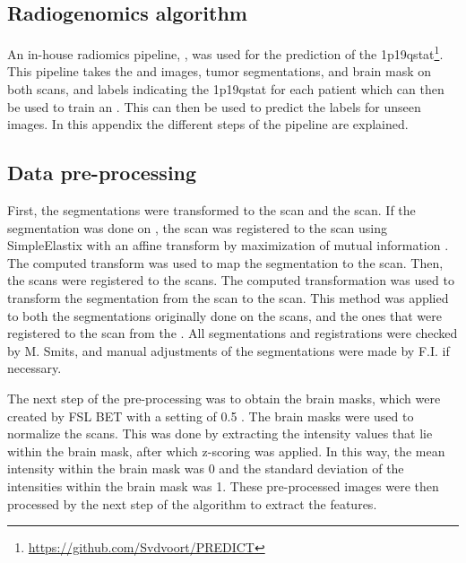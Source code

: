 \clearpage
\begin{subappendices}
\section{Radiogenomics algorithm}\label{app:LGG_1p19q_algorithm}
An in-house radiomics pipeline, , was used for the prediction of the \acl{1p19qstat}\footnote{\url{https://github.com/Svdvoort/PREDICT}}.
This pipeline takes the  and   images, \gls{tumor} segmentations, and brain mask on both scans, and labels indicating the \acl{1p19qstat} for each patient which can then be used to train an  \autocite{cortes1995support}.
This  can then be used to predict the labels for unseen images. In this appendix the different steps of the pipeline are explained.

\subsection{Data pre-processing}
First, the segmentations were transformed to the  scan and the  scan.
If the segmentation was done on , the  scan was registered to the  scan using SimpleElastix with an affine transform by maximization of mutual information \autocite{marstal2016simpleelastix}.
The computed transform was used to map the  segmentation to the  scan.
Then, the  scans were registered to the  scans.
The computed transformation was used to transform the segmentation from the  scan to the  scan.
This method was applied to both the segmentations originally done on the  scans, and the ones that were registered to the  scan from the .
All segmentations and registrations were checked by M. Smits, and manual adjustments of the segmentations were made by F.I. if necessary.

The next step of the pre-processing was to obtain the brain masks, which were created by FSL BET with a setting of 0.5 \autocite{smith2002fast}.
The brain masks were used to normalize the scans.
This was done by extracting the intensity values that lie within the brain mask, after which z-scoring was applied.
In this way, the mean intensity within the brain mask was 0 and the standard deviation of the intensities within the brain mask was 1.
These pre-processed images were then processed by the next step of the algorithm to extract the features.


\end{subappendices}
